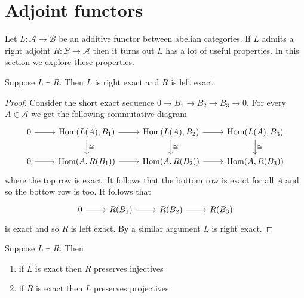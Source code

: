 \documentclass{memoir}
\begin{document}
\section{Adjoint functors}
Let $L:\mathcal A\to\mathcal B$ be an additive functor between abelian categories.
If $L$ admits a right adjoint $R:\mathcal B\to\mathcal A$ then it turns out $L$ has a lot of useful properties. 
In this section we explore these properties.
\begin{proposition}
    Suppose $L\dashv R$. Then $L$ is right exact and $R$ is left exact.
\end{proposition}
\begin{proof}
    Consider the short exact sequence $0\to B_1\to B_2\to B_3\to 0$. For every $A\in\mathcal A$ we get the following commutative diagram 
    \begin{equation}
        \begin{tikzcd}
            0 \arrow[r] & \Hom(L(A),B_1) \arrow[r] \arrow[d,"\cong"] & \Hom(L(A),B_2) \arrow[r] \arrow[d,"\cong"] & \Hom(L(A),B_3) \arrow[d,"\cong"] \\
            0 \arrow[r] & \Hom(A,R(B_1)) \arrow[r] & \Hom(A,R(B_2)) \arrow[r] & \Hom(A,R(B_3))
        \end{tikzcd}
    \end{equation}
    where the top row is exact.
    It follows that the bottom row is exact for all $A$ and so the bottow row is too.
    It follows that 
    \begin{equation}
        \begin{tikzcd}
            0 \arrow[r] & R(B_1) \arrow[r] & R(B_2) \arrow[r] & R(B_3)
        \end{tikzcd}
    \end{equation}
    is exact and so $R$ is left exact.
    By a similar argument $L$ is right exact.
\end{proof}
\begin{proposition}
    Suppose $L\dashv R$. Then
    \begin{enumerate}
        \item if $L$ is exact then $R$ preserves injectives
        \item if $R$ is exact then $L$ preserves projectives.
    \end{enumerate}
\end{proposition}
\end{document}
